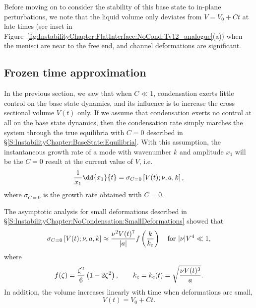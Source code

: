 Before moving on to consider the stability of this base state to in-plane perturbations, we note that the liquid volume only deviates from $V = V_0 + Ct$ at late times (see inset in Figure~\ref{fig:InstabilityChapter:FlatInterface:NoCond:Tv12_analogue}(a)) when the menisci are near to the free end, and channel deformations are significant.

\subsection{Frozen time approximation}\label{S:InstabilityChapter:WithCondensation:FrozenTime}
In the previous section, we saw that when $C \ll 1$, condensation exerts little control on the base state dynamics, and its influence is to increase the cross sectional volume $V(t)$ only. If we assume that condensation exerts no control at all on the base state dynamics, then the condensation rate simply marches the system through the true equilibria with $C = 0$ described in \S\ref{S:InstabilityChapter:BaseState:Equilibria}. With this assumption, the instantaneous growth rate of a mode with wavenumber $k$ and amplitude $x_1$ will be the $C = 0$ result at the current value of $V$, i.e.
\begin{equation}\label{E:InstabilityChapter:NonZeroCond:Quasistatic:InstantaneousSigma}
\frac{1}{x_1}\dd{x_1}{t} = \sigma_{C=0}\left[V(t);\nu, \aspect,k\right],
\end{equation}
where $\sigma_{C=0}$ is the growth rate obtained with $C = 0$.

The asymptotic analysis for small deformations described in \S\ref{S:InstabilityChapter:NoCondensation:SmallDeformations} showed that
\begin{equation}\label{E:InstabilityChapter:NonZeroCond:Quasistatic:InstantaneousSigmaAsymptotic}
 \sigma_{C=0}\left[V(t);\nu, a,k\right] \approx \frac{\nu^2 V(t)^7}{|a|}f\left(\frac{k}{k_c}\right)\quad \text{for}~|\nu| V^4 \ll 1,
\end{equation}
where
\begin{equation}\label{E:InstabilityChapter:NonZeroCond:Quasistatic:InstantaneousSigmaAsymptoticSpecifics}
f(\zeta) = \frac{\zeta^2}{6}\left(1-2\zeta^2 \right), \qquad k_c = k_c(t) = \sqrt{\frac{\nu V(t)^3}{a}}.
\end{equation}
In addition, the volume increases linearly with time when deformations are small,
\begin{equation}
V(t) = V_0 + Ct.
\end{equation}

